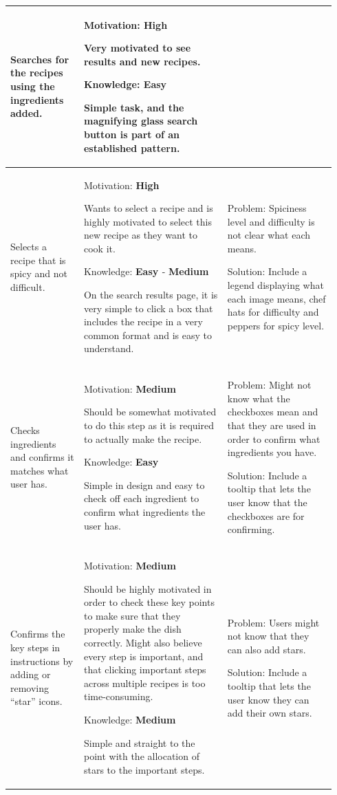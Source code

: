 \documentclass[11pt,english]{article}
\begin{document}
\begin{longtable}{!{\color{black}\vrule}>{\hspace{0pt}}m{0.21\linewidth}!{\color{black}\vrule}>{\hspace{0pt}}m{0.41\linewidth}!{\color{black}\vrule}>{\hspace{0pt}}m{0.319\linewidth}!{\color{black}\vrule}}
Searches for the recipes using the ingredients added. & Motivation: \textbf{\textcolor[rgb]{0,0.502,0}{High}}\par{}Very motivated to see results and new recipes.\par{}Knowledge: \textbf{\textcolor[rgb]{0,0.502,0}{Easy}}\par{}Simple task, and the magnifying glass search button is part of an established pattern. &  \\ \hline
Selects a recipe that is spicy and not difficult. & Motivation: \textcolor[rgb]{0,0.502,0}{\textbf{High}}\par{}Wants to select a recipe and is highly motivated to select this new recipe as they want to cook it.\par{}Knowledge: \textbf{\textcolor[rgb]{0,0.502,0}{Easy }}- \textbf{\textcolor[rgb]{1,0.647,0}{Medium}}\par{}On the search results page, it is very simple to click a box that includes the recipe in a very common format and is easy to understand. & Problem: Spiciness level and difficulty is not clear what each means.\par{}Solution: Include a legend displaying what each image means, chef hats for difficulty and peppers for spicy level. \\ \hline
Checks ingredients and confirms it matches what user has. & Motivation: \textbf{\textcolor[rgb]{1,0.647,0}{Medium}}\par{}Should be somewhat motivated to do this step as it is required to actually make the recipe.\par{}Knowledge: \textbf{\textcolor[rgb]{0,0.502,0}{Easy}}\par{}Simple in design and easy to check off each ingredient to confirm what ingredients the user has. & Problem: Might not know what the checkboxes mean and that they are used in order to confirm what ingredients you have.\par{}Solution: Include a tooltip that lets the user know that the checkboxes are for confirming. \\ \hline
Confirms the key steps in instructions by adding or~ removing “star” icons. & Motivation: \textbf{\textcolor[rgb]{1,0.647,0}{Medium}}\par{}Should be highly motivated in order to check these key points to make sure that they properly make the dish correctly. Might also believe every step is important, and that clicking important steps across multiple recipes is too time-consuming.\par{}Knowledge: \textbf{\textcolor[rgb]{1,0.647,0}{Medium}}\par{}Simple and straight to the point with the allocation of stars to the important steps. & Problem: Users might not know that they can also add stars.\par{}Solution: Include a tooltip that lets the user know they can add their own stars. \\ \hline

\end{longtable}
\end{document}
